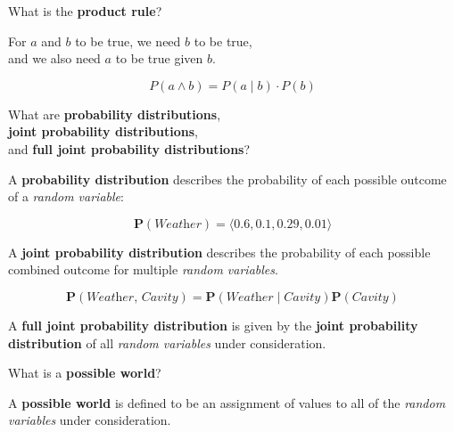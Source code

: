 \begin{flashcard}[Question]{What is the \textbf{product rule}?}

\begin{center}
For $a$ and $b$ to be true, we need $b$ to be true,\\and we also need $a$ to be true given $b$.
\end{center}

\begin{displaymath}
P(a \land b) = P(a \mid b) \cdot P(b)
\end{displaymath}

\end{flashcard}

\begin{flashcard}[Question]{What are \textbf{probability distributions},\\\textbf{joint probability distributions},\\and \textbf{full joint probability distributions}?}

A \textbf{probability distribution} describes the probability of each possible outcome of a \textit{random variable}:

\medskip

\begin{displaymath}
\mathbf{P}(\textit{Weather}) = \langle 0.6, 0.1, 0.29, 0.01 \rangle
\end{displaymath}

\medskip

A \textbf{joint probability distribution} describes the probability of each possible combined outcome for multiple \textit{random variables}.

\begin{displaymath}
\mathbf{P}(\textit{Weather, Cavity}) = \mathbf{P}(\textit{Weather} \mid \textit{Cavity}) \mathbf{P}(\textit{Cavity})
\end{displaymath}

\medskip

A \textbf{full joint probability distribution} is given by the \textbf{joint probability distribution} of all \textit{random variables} under consideration.

\end{flashcard}

\begin{flashcard}[Question]{What is a \textbf{possible world}?}

A \textbf{possible world} is defined to be an assignment of values to all of the \textit{random variables} under consideration.

\end{flashcard}

